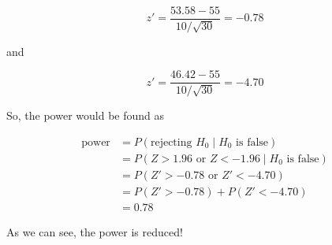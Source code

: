\documentclass[11pt]{article}
\begin{document}
\[
z'=\frac{53.58-55}{10/\sqrt{30}} = -0.78
\]

and 

\[
z'=\frac{46.42-55}{10/\sqrt{30}} = -4.70
\]

So, the power would be found as 

\begin{align*}
 \text{power} &= P(\text{rejecting }H_0 \mid H_0 \text{ is false})\\
 & = P(Z>1.96 \text{ or } Z<-1.96 \mid H_0\text{ is false})\\
 & = P(Z'>-0.78 \text{ or }Z'<-4.70)\\
 & = P(Z'>-0.78) + P(Z'<-4.70)\\
 & = 0.78
\end{align*}

As we can see, the power is reduced!  
\end{document}
